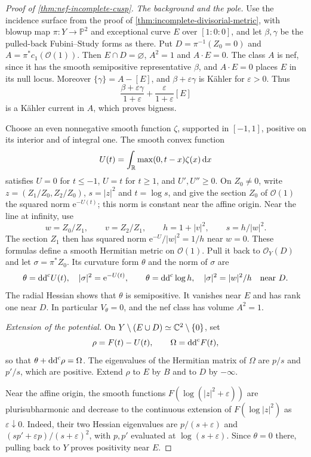 \begin{proof}[Proof of \cref{thm:nef-incomplete-cusp}]
\emph{The background and the pole.}
Use the incidence surface from the proof of \cref{thm:incomplete-divisorial-metric}, with blowup map $\pi\colon Y\to\mathbb P^2$ and exceptional curve $E$ over $[1:0:0]$, and let $\beta,\gamma$ be the pulled-back Fubini--Study forms as there. Put $D=\pi^{-1}(Z_0=0)$ and $A=\pi^*c_1(\mathcal O(1))$. Then $E\cap D=\varnothing$, $A^2=1$ and $A\cdot E=0$. The class $A$ is nef, since it has the smooth semipositive representative $\beta$, and $A\cdot E=0$ places $E$ in its null locus. Moreover $\{\gamma\}=A-[E]$, and $\beta+\varepsilon\gamma$ is K\"ahler for $\varepsilon>0$. Thus
\[
 \frac{\beta+\varepsilon\gamma}{1+\varepsilon}
       +\frac{\varepsilon}{1+\varepsilon}[E]
\]
is a K\"ahler current in $A$, which proves bigness.

Choose an even nonnegative smooth function $\zeta$, supported in $[-1,1]$, positive on its interior and of integral one. The smooth convex function
\[
 U(t)=\int_\mathbb R\max(0,t-x)\zeta(x)\,\mathrm{d}x
\]
satisfies $U=0$ for $t\leq-1$, $U=t$ for $t\geq1$, and $U',U''\geq0$. On $Z_0\ne0$, write $z=(Z_1/Z_0,Z_2/Z_0)$, $s=|z|^2$ and $t=\log s$, and give the section $Z_0$ of $\mathcal O(1)$ the squared norm $\mathrm{e}^{-U(t)}$; this norm is constant near the affine origin. Near the line at infinity, use
\[
 w=Z_0/Z_1,\qquad v=Z_2/Z_1,\qquad h=1+|v|^2,
 \qquad s=h/|w|^2.
\]
The section $Z_1$ then has squared norm $\mathrm{e}^{-U}/|w|^2=1/h$ near $w=0$. These formulas define a smooth Hermitian metric on $\mathcal O(1)$. Pull it back to $\mathcal O_Y(D)$ and let $\sigma=\pi^*Z_0$. Its curvature form $\theta$ and the norm of $\sigma$ are
\[
 \theta=\mathrm{dd}^{\mathrm{c}} U(t),\quad |\sigma|^2=\mathrm{e}^{-U(t)},\qquad
 \theta=\mathrm{dd}^{\mathrm{c}}\log h,\quad |\sigma|^2=|w|^2/h\quad\hbox{near }D.
\]
The radial Hessian shows that $\theta$ is semipositive. It vanishes near $E$ and has rank one near $D$. In particular $V_\theta=0$, and the nef class has volume $A^2=1$.

\emph{Extension of the potential.}
On $Y\setminus(E\cup D)\simeq\mathbb C^2\setminus\{0\}$, set
\[
 \rho=F(t)-U(t),\qquad \Omega=\mathrm{dd}^{\mathrm{c}} F(t),
\]
so that $\theta+\mathrm{dd}^{\mathrm{c}}\rho=\Omega$. The eigenvalues of the Hermitian matrix of $\Omega$ are $p/s$ and $p'/s$, which are positive. Extend $\rho$ to $E$ by $B$ and to $D$ by $-\infty$.

Near the affine origin, the smooth functions $F(\log(|z|^2+\varepsilon))$ are plurisubharmonic and decrease to the continuous extension of $F(\log|z|^2)$ as $\varepsilon\downarrow0$. Indeed, their two Hessian eigenvalues are $p/(s+\varepsilon)$ and $(s p'+\varepsilon p)/(s+\varepsilon)^2$, with $p,p'$ evaluated at $\log(s+\varepsilon)$. Since $\theta=0$ there, pulling back to $Y$ proves positivity near $E$.


\end{proof}
